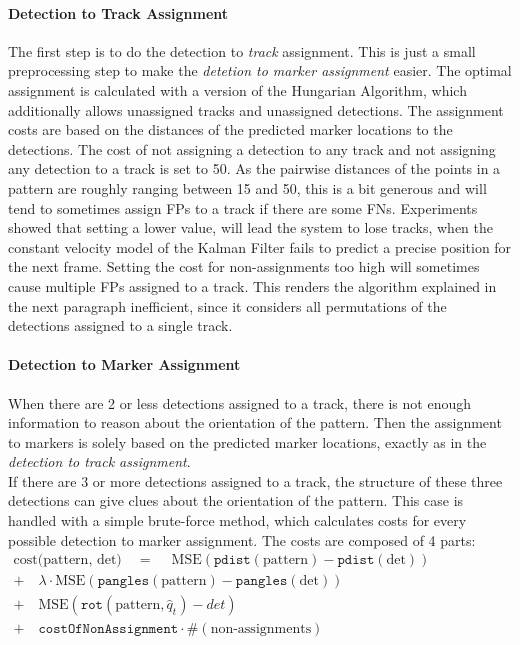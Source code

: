 \documentclass{article}
\begin{document}
\paragraph{Detection to Track Assignment} 
The first step is to do the detection to \emph{track} assignment. This is just a small preprocessing step to make the \emph{detetion to marker assignment} easier. The optimal assignment is calculated with a version of the Hungarian Algorithm, which additionally allows unassigned tracks and unassigned detections. The assignment costs are based on the distances of the predicted marker locations to the detections. The cost of not assigning a detection to any track and not assigning any detection to a track is set to 50. As the pairwise distances of the points in a pattern are roughly ranging between 15 and 50, this is a bit generous and will tend to sometimes assign FPs to a track if there are some FNs. Experiments showed that setting a lower value, will lead the system to lose tracks, when the constant velocity model of the Kalman Filter fails to predict a precise position for the next frame. Setting the cost for non-assignments too high will sometimes cause multiple FPs assigned to a track. This renders the algorithm explained in the next paragraph inefficient, since it considers all permutations of the detections assigned to a single track.

\paragraph{Detection to Marker Assignment}
When there are 2 or less detections assigned to a track, there is not enough information to reason about the orientation of the pattern. Then the assignment to markers is solely based on the predicted marker locations, exactly as in the \emph{detection to track assignment}.\\
If there are 3 or more detections assigned to a track, the structure of these three detections can give clues about the orientation of the pattern. This case is handled with a simple brute-force method, which calculates costs for every possible detection to marker assignment. The costs are composed of 4 parts:
\begin{equation}
\begin{split}
 \text{cost(pattern, det)} \quad = \quad  ~ \text{MSE}\left(\texttt{pdist}(\text{pattern}) - \texttt{pdist}(\text{det}) \right)  \qquad \qquad \qquad \qquad \qquad \quad \\
  +\quad \lambda \cdot \text{MSE}\left( \texttt{pangles}(\text{pattern}) - \texttt{pangles}(\text{det}) \right) \qquad \qquad \qquad ~~ \\
  +\quad \text{MSE}\left(\texttt{rot}(\text{pattern},\hat{q}_t) - det\right) \quad \qquad \qquad \qquad \qquad \qquad \quad ~\\
  +\quad \texttt{costOfNonAssignment} \cdot \#(\text{non-assignments}) \quad \qquad \qquad \quad
\end{split}
\end{equation}
\end{document}
